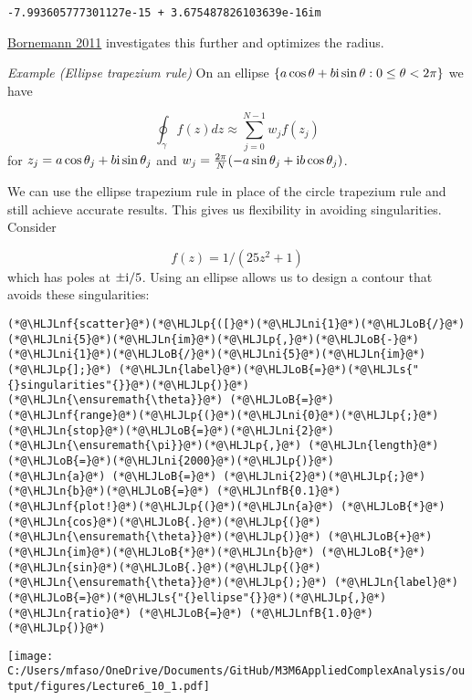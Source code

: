 \documentclass[12pt,a4paper]{article}
\newcommand{\HLJLn}[1]{#1}
\newcommand{\HLJLnf}[1]{\textcolor[RGB]{66,102,213}{#1}}
\newcommand{\HLJLs}[1]{\textcolor[RGB]{201,61,57}{#1}}
\newcommand{\HLJLnfB}[1]{\textcolor[RGB]{59,151,46}{#1}}
\newcommand{\HLJLni}[1]{\textcolor[RGB]{59,151,46}{#1}}
\newcommand{\HLJLoB}[1]{\textcolor[RGB]{102,102,102}{\textbf{#1}}}
\newcommand{\HLJLp}[1]{#1}
\def\I{ {\rm i} }
\begin{document}
\begin{lstlisting}
-7.993605777301127e-15 + 3.675487826103639e-16im
\end{lstlisting}


\href{https://www-m3.ma.tum.de/foswiki/pub/M3/Allgemeines/FolkmarBornemannPublications/FoCM_Stability_Cauchy_Integrals.pdf}{Bornemann 2011} investigates this further and optimizes the radius.

\emph{Example (Ellipse trapezium rule)} On an ellipse $\{a \cos \theta + b \I \sin \theta : 0 \leq \theta < 2 \pi\}$ we have

\[
\oint_\gamma f(z) dz \approx  \sum_{j=0}^{N-1} w_j f(z_j)
\]
for $z_j = a \cos \theta_j + b \I \sin \theta_j$ and $w_j = {2 \pi \over N} (-a \sin \theta_j + \I b \cos \theta_j)$.

We can use the ellipse trapezium rule in place of the circle trapezium rule and still achieve accurate results. This gives us flexibility in avoiding singularities. Consider

\[
f(z) = 1/(25z^2 + 1)
\]
which has poles at $\pm  \I/5$. Using an ellipse allows us to design a contour that avoids these singularities:


\begin{lstlisting}
(*@\HLJLnf{scatter}@*)(*@\HLJLp{([}@*)(*@\HLJLni{1}@*)(*@\HLJLoB{/}@*)(*@\HLJLni{5}@*)(*@\HLJLn{im}@*)(*@\HLJLp{,}@*)(*@\HLJLoB{-}@*)(*@\HLJLni{1}@*)(*@\HLJLoB{/}@*)(*@\HLJLni{5}@*)(*@\HLJLn{im}@*)(*@\HLJLp{];}@*) (*@\HLJLn{label}@*)(*@\HLJLoB{=}@*)(*@\HLJLs{"{}singularities"{}}@*)(*@\HLJLp{)}@*)
(*@\HLJLn{\ensuremath{\theta}}@*) (*@\HLJLoB{=}@*) (*@\HLJLnf{range}@*)(*@\HLJLp{(}@*)(*@\HLJLni{0}@*)(*@\HLJLp{;}@*) (*@\HLJLn{stop}@*)(*@\HLJLoB{=}@*)(*@\HLJLni{2}@*)(*@\HLJLn{\ensuremath{\pi}}@*)(*@\HLJLp{,}@*) (*@\HLJLn{length}@*)(*@\HLJLoB{=}@*)(*@\HLJLni{2000}@*)(*@\HLJLp{)}@*)
(*@\HLJLn{a}@*) (*@\HLJLoB{=}@*) (*@\HLJLni{2}@*)(*@\HLJLp{;}@*) (*@\HLJLn{b}@*)(*@\HLJLoB{=}@*) (*@\HLJLnfB{0.1}@*)
(*@\HLJLnf{plot!}@*)(*@\HLJLp{(}@*)(*@\HLJLn{a}@*) (*@\HLJLoB{*}@*) (*@\HLJLn{cos}@*)(*@\HLJLoB{.}@*)(*@\HLJLp{(}@*)(*@\HLJLn{\ensuremath{\theta}}@*)(*@\HLJLp{)}@*) (*@\HLJLoB{+}@*) (*@\HLJLn{im}@*)(*@\HLJLoB{*}@*)(*@\HLJLn{b}@*) (*@\HLJLoB{*}@*) (*@\HLJLn{sin}@*)(*@\HLJLoB{.}@*)(*@\HLJLp{(}@*)(*@\HLJLn{\ensuremath{\theta}}@*)(*@\HLJLp{);}@*) (*@\HLJLn{label}@*)(*@\HLJLoB{=}@*)(*@\HLJLs{"{}ellipse"{}}@*)(*@\HLJLp{,}@*) (*@\HLJLn{ratio}@*) (*@\HLJLoB{=}@*) (*@\HLJLnfB{1.0}@*)(*@\HLJLp{)}@*)
\end{lstlisting}

\texttt{[image: C:/Users/mfaso/OneDrive/Documents/GitHub/M3M6AppliedComplexAnalysis/output/figures/Lecture6\_10\_1.pdf]}
\end{document}
